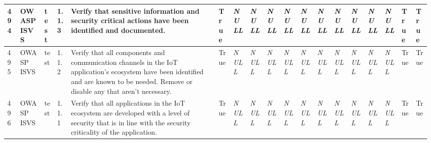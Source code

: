 \begin{longtable}{|l|l|l|l|l|l|l|l|l|l|l|l|l|l|l|l|l|l|}
494 & OWASP ISVS & test & 1.1.3 & Verify that sensitive information and security critical actions have been identified and documented. & True & \textit{NULL} & \textit{NULL} & \textit{NULL} & \textit{NULL} & \textit{NULL} & \textit{NULL} & \textit{NULL} & \textit{NULL} & \textit{NULL} & \textit{NULL} & True & True \\ \hline 
495 & OWASP ISVS & test & 1.1.2 & Verify that all components and communication channels in the IoT application's ecosystem have been identified and are known to be needed. Remove or disable any that aren't necessary. & True & \textit{NULL} & \textit{NULL} & \textit{NULL} & \textit{NULL} & \textit{NULL} & \textit{NULL} & \textit{NULL} & \textit{NULL} & \textit{NULL} & \textit{NULL} & True & True \\ \hline 
496 & OWASP ISVS & test & 1.1.1 & Verify that all applications in the IoT ecosystem are developed with a level of security that is in line with the security criticality of the application. & True & \textit{NULL} & \textit{NULL} & \textit{NULL} & \textit{NULL} & \textit{NULL} & \textit{NULL} & \textit{NULL} & \textit{NULL} & \textit{NULL} & \textit{NULL} & True & True \\ \hline 
 \end{longtable}
